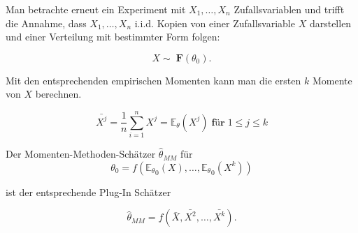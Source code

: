 \documentclass[10pt]{article}
\newcommand{\FZV}{X_1, \ldots, X_n} %
\newcommand{\EW}{\mathbb{E}} %
\begin{document}
	\noindent Man betrachte erneut ein Experiment mit $\FZV$ Zufallsvariablen und trifft die Annahme, dass $\FZV$ i.i.d. Kopien von einer Zufallsvariable $X$ darstellen und einer Verteilung mit bestimmter Form folgen:

\vspace{-2mm}
\begin{equation*}
	X \sim \; \textbf{F}(\theta_0).
\end{equation*}

	\noindent Mit den entsprechenden empirischen Momenten kann man die ersten $k$ Momente von $X$ berechnen. 

\begin{equation*}
	\bar{X^j} = \frac{1}{n} \sum_{i=1}^n X^j = \EW_\theta(X^j)\; \textbf{für} \; 1\leq j \leq k 
\end{equation*}

	\noindent Der Momenten-Methoden-Schätzer $\hat{\theta}_{MM}$ für 
\begin{equation*}
\theta_0 = f({\EW_\theta}_{0}(X),\ldots,{\EW_\theta}_{0}(X^k))
\end{equation*}

	\noindent ist der entsprechende Plug-In Schätzer

\begin{equation*}
	\hat{\theta}_{MM} = f(\bar{X},\bar{X^2}, \ldots, \bar{X^k}).
\end{equation*}
\end{document}
